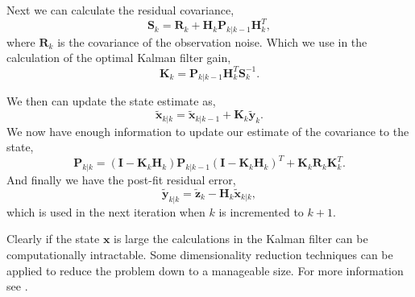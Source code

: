 Next we can calculate the residual covariance,
\begin{equation}
\mathbf{S}_k = \mathbf{R}_k + \mathbf{H}_{k}\mathbf{P}_{k|k-1}\mathbf{H}_{k}^T,
\end{equation}
\noindent
where $\mathbf{R}_k$ is the covariance of the observation noise. Which we use in the calculation of the optimal Kalman filter gain,
\begin{equation}
\mathbf{K}_k = \mathbf{P}_{k|k-1}\mathbf{H}_{k}^T\mathbf{S}_k^{-1}.
\end{equation}
\noindent

We then can update the state estimate as,
\begin{equation}
\tilde{\mathbf{x}}_{k|k} = \tilde{\mathbf{x}}_{k|k-1} +  \mathbf{K}_k\tilde{\mathbf{y}}_{k}.
\end{equation}
\noindent
We now have enough information to update our estimate of the covariance to the state,
\begin{equation}
\mathbf{P}_{k|k} = \left(\mathbf{I} - \mathbf{K}_k\mathbf{H}_{k}\right) \mathbf{P}_{k|k-1}\left(\mathbf{I} - \mathbf{K}_k\mathbf{H}_{k}\right)^T + \mathbf{K}_k\mathbf{R}_k\mathbf{K}_k^T.
\end{equation}
\noindent
And finally we have the post-fit residual error,
\begin{equation}
\tilde{\mathbf{y}}_{k|k} = \tilde{\mathbf{z}}_{k} -  \mathbf{H}_k\tilde{\mathbf{x}}_{k|k},
\end{equation}
\noindent
which is used in the next iteration when $k$ is incremented to $k+1$. 

Clearly if the state $\mathbf{x}$ is large the calculations in the Kalman filter can be computationally intractable. Some dimensionality reduction techniques can be applied to reduce the problem down to a manageable size. For more information see \cite{Kay98}.
